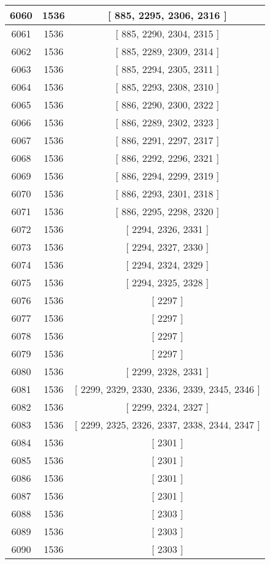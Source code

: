 \begin{center}
\begin{longtable}[H]{|| c c c ||}
\hline
6060 & 1536 & [ 885, 2295, 2306, 2316 ] \\ 
\hline
6061 & 1536 & [ 885, 2290, 2304, 2315 ] \\ 
\hline
6062 & 1536 & [ 885, 2289, 2309, 2314 ] \\ 
\hline
6063 & 1536 & [ 885, 2294, 2305, 2311 ] \\ 
\hline
6064 & 1536 & [ 885, 2293, 2308, 2310 ] \\ 
\hline
6065 & 1536 & [ 886, 2290, 2300, 2322 ] \\ 
\hline
6066 & 1536 & [ 886, 2289, 2302, 2323 ] \\ 
\hline
6067 & 1536 & [ 886, 2291, 2297, 2317 ] \\ 
\hline
6068 & 1536 & [ 886, 2292, 2296, 2321 ] \\ 
\hline
6069 & 1536 & [ 886, 2294, 2299, 2319 ] \\ 
\hline
6070 & 1536 & [ 886, 2293, 2301, 2318 ] \\ 
\hline
6071 & 1536 & [ 886, 2295, 2298, 2320 ] \\ 
\hline
6072 & 1536 & [ 2294, 2326, 2331 ] \\ 
\hline
6073 & 1536 & [ 2294, 2327, 2330 ] \\ 
\hline
6074 & 1536 & [ 2294, 2324, 2329 ] \\ 
\hline
6075 & 1536 & [ 2294, 2325, 2328 ] \\ 
\hline
6076 & 1536 & [ 2297 ] \\ 
\hline
6077 & 1536 & [ 2297 ] \\ 
\hline
6078 & 1536 & [ 2297 ] \\ 
\hline
6079 & 1536 & [ 2297 ] \\ 
\hline
6080 & 1536 & [ 2299, 2328, 2331 ] \\ 
\hline
6081 & 1536 & [ 2299, 2329, 2330, 2336, 2339, 2345, 2346 ] \\ 
\hline
6082 & 1536 & [ 2299, 2324, 2327 ] \\ 
\hline
6083 & 1536 & [ 2299, 2325, 2326, 2337, 2338, 2344, 2347 ] \\ 
\hline
6084 & 1536 & [ 2301 ] \\ 
\hline
6085 & 1536 & [ 2301 ] \\ 
\hline
6086 & 1536 & [ 2301 ] \\ 
\hline
6087 & 1536 & [ 2301 ] \\ 
\hline
6088 & 1536 & [ 2303 ] \\ 
\hline
6089 & 1536 & [ 2303 ] \\ 
\hline
6090 & 1536 & [ 2303 ] \\ 

\end{longtable}
\end{center}
